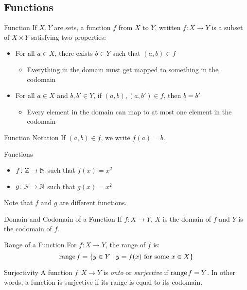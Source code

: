 \documentclass[class=article, crop=false]{standalone}
\begin{document}
  \subsection{Functions}
  \begin{definition}{Function}
    If $X, Y$ are sets, a function $f$ from $X$ to $Y$, written $f\colon X\to Y$ is a subset of $X\times Y$ satisfying two properties:
    \begin{itemize}
      \item For all $a\in X$, there exists $b\in Y$ such that $(a, b)\in f$
      \begin{itemize}
        \item Everything in the domain must get mapped to something in the codomain
      \end{itemize}
      \item For all $a\in X$ and $b, b'\in Y$, if $(a, b), (a, b')\in f$, then $b = b'$
      \begin{itemize}
        \item Every element in the domain can map to at most one element in the codomain
      \end{itemize}
    \end{itemize}
  \end{definition}
  \begin{note}{Function Notation}
    If $(a, b)\in f$, we write $f(a) = b$.
  \end{note}
  \begin{example}{Functions}
    \begin{itemize}
      \item $f\colon \mathbb{Z}\to \mathbb{N}$ such that $f(x) = x^2$
      \item $g\colon \mathbb{N}\to \mathbb{N}$ such that $g(x) = x^2$
    \end{itemize}
    Note that $f$ and $g$ are different functions.
  \end{example}
  \begin{definition}{Domain and Codomain of a Function}
    If $f\colon X\to Y$, $X$ is the domain of $f$ and $Y$ is the codomain of $f$.
  \end{definition}
  \begin{definition}{Range of a Function}
    For $f\colon X\to Y$, the range of $f$ is:
    \[
      \operatorname{range} f = \left\{y\in Y\mid y = f(x) \text{ for some }x\in X\right\}
    \]
  \end{definition}
  \begin{definition}{Surjectivity}
    A function $f\colon X\to Y$ is \emph{onto} or \emph{surjective} if $\operatorname{range} f = Y$. In other words, a function is surjective if its range is equal to its codomain.
  \end{definition}
\end{document}
